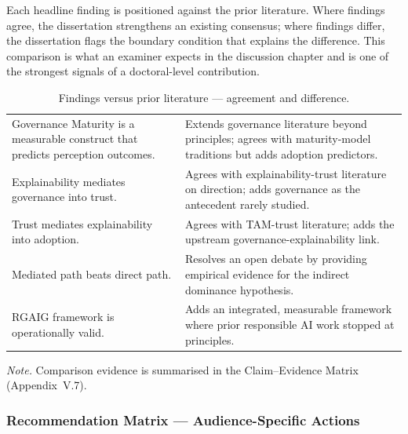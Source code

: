\noindent Each headline finding is positioned against the prior literature. Where findings agree, the dissertation strengthens an existing consensus; where findings differ, the dissertation flags the boundary condition that explains the difference. This comparison is what an examiner expects in the discussion chapter and is one of the strongest signals of a doctoral-level contribution.

{\tablestripes\tablefontsize
{}
\begin{xltabular}{\textwidth}{@{} >{\raggedright\arraybackslash}p{5cm} L @{}}
\caption[Findings versus prior literature --- agreement and difference]{Findings versus prior literature --- agreement and difference.}\label{tab:ch5_literature_comparison} \\
\toprule
{} &  \\
\midrule
\endfirsthead
\endhead
\bottomrule
\endlastfoot
Governance Maturity is a measurable construct that predicts perception outcomes. & Extends governance literature beyond principles; agrees with maturity-model traditions but adds adoption predictors. \\
\addlinespace
Explainability mediates governance into trust. & Agrees with explainability-trust literature on direction; adds governance as the antecedent rarely studied. \\
\addlinespace
Trust mediates explainability into adoption. & Agrees with TAM-trust literature; adds the upstream governance-explainability link. \\
\addlinespace
Mediated path beats direct path. & Resolves an open debate by providing empirical evidence for the indirect dominance hypothesis. \\
\addlinespace
RGAIG framework is operationally valid. & Adds an integrated, measurable framework where prior responsible AI work stopped at principles. \\
\end{xltabular}}

\vspace{0.3em}\noindent\textit{Note.} Comparison evidence is summarised in the Claim--Evidence Matrix (Appendix~V.7).


\subsubsection{Recommendation Matrix --- Audience-Specific Actions}
\label{sec:ch5_recommendation_matrix_dedicated}

